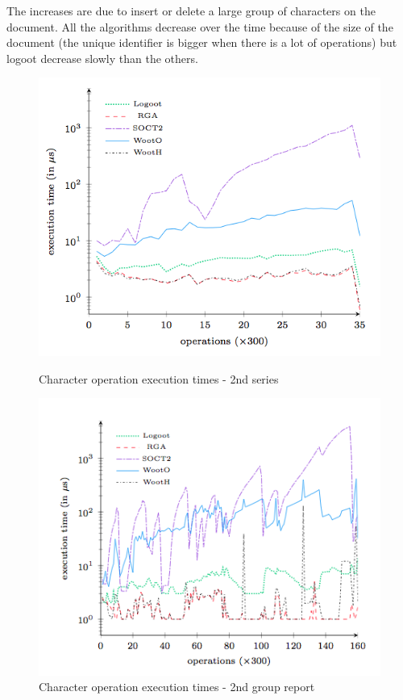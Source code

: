 The increases are due to insert or delete a large group of characters on the document. All the algorithms decrease over the time because of the size of the document (the unique identifier is bigger when there is a lot of operations) but logoot decrease slowly than the others.\\

\begin{figure}
\begin{minipage}{.50\linewidth}
\includegraphics[width=1.2\textwidth]{includes/characters_operations_1t_big.png}
  \caption{Character operation execution times - 2nd
series}
  \label{fig:characters_operations_1t_big}
\end{minipage} \hfill
\begin{minipage}{0.50\linewidth}
  \includegraphics[width=1.2\textwidth]{includes/characters_operations_2g_report.png}
  \caption{Character operation execution times - 2nd
group report}
  \label{fig:characters_operations_2g_report}
  \end{minipage} \hfill
\end{figure}
